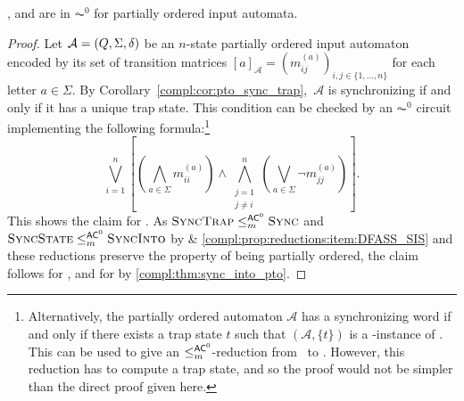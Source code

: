 \begin{theorem}
	\label{compl:thm:pto_sync_in_AC0}
	\DFAS, \DFAST and \DFASS are in $\AC^0$ for partially ordered input automata.
\end{theorem}
\begin{proof}
	Let  $\mathcal A = (Q, \Sigma, \delta)$ be an $n$-state partially ordered
	input automaton encoded
	by its set of transition matrices
	$[a]_{\mathcal A} = (m_{ij}^{(a)})_{i,j\in \{1,\ldots,n\}}$
	for each letter $a \in \Sigma$.
	By Corollary~\ref{compl:cor:pto_sync_trap},~$\mathcal A$ is synchronizing
	if and only if it has a unique trap state.
	This condition can be checked by an $\AC^0$ circuit
	implementing the following formula:\footnote{Alternatively,
		the partially ordered automaton $\mathcal A$ has a synchronizing word
		if and only if there exists a trap state $t$ such that $(\mathcal A, \{t\})$ is a \rYES-instance of \SIS.
		This can be used to give an $\le_m^{\textup{\textsf{AC}}^0}$-reduction
		from \DFAS\ to \SIS. However, this reduction has to compute a trap state, and so the proof
		would not be simpler than the direct proof given here.
	}
	\[
	\bigvee_{i=1}^n \left[ \left( \bigwedge_{a \in \Sigma} m_{ii}^{(a)} \right) 
	\land 
	\bigwedge_{\substack{j=1 \\ j \ne i}}^n \left( \bigvee_{a \in \Sigma} \neg m_{jj}^{(a)}  \right) \right].
	\]
	This shows the claim for \DFAS. 
	As $\textsc{\sc Sync\-Trap} \le_m^{\textup{\textsf{AC}}^0} \text{\sc Sync}$
	and 
	$\text{\sc Sync\-State} \le_m^{\textup{\textsf{AC}}^0} \textsc{\sc Sync\-Into}$
	by  \& \ref{compl:prop:reductions:item:DFASS_SIS}
	and these reductions preserve the property of being partially ordered,
	the claim follows for \DFAST, and for \DFASS 
	by \cref{compl:thm:sync_into_pto}.	
\end{proof}
